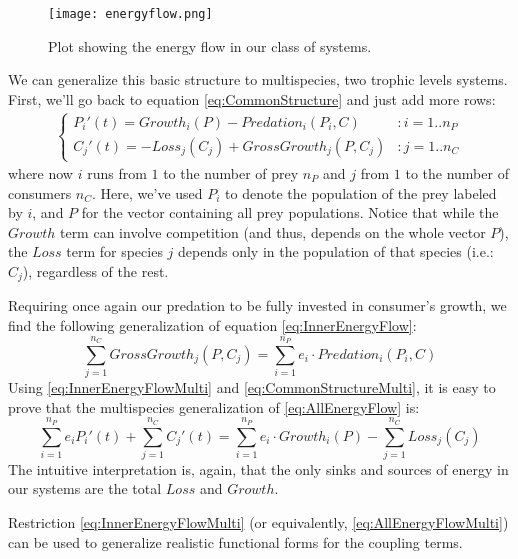 \begin{figure}[H]
	\begin{center}
		\texttt{[image: energyflow.png]}
	\end{center}
	\caption{Plot showing the energy flow in our class of systems.}
	\label{fig:EnergyFlow}
\end{figure}

We can generalize this basic structure to multispecies, two trophic levels systems. First, we'll go back to equation \eqref{eq:CommonStructure} and just add more rows:
%
\begin{eqnarray}
\label{eq:CommonStructureMulti}
	\begin{cases}
	P_i'(t) = Growth_i(P) - Predation_i(P_i,C) & : i = 1..n_P
	\\
	C_j'(t) = -Loss_j(C_j) + GrossGrowth_j(P,C_j) & : j = 1..n_C
	\end{cases}
\end{eqnarray}
%
where now $i$ runs from $1$ to the number of prey $n_P$ and $j$ from $1$ to the number of consumers $n_C$. Here, we've used $P_i$ to denote the population of the prey labeled by $i$, and $P$ for the vector containing all prey populations. Notice that while the $Growth$ term can involve competition (and thus, depends on the whole vector $P$), the $Loss$ term for species $j$ depends only in the population of that species (i.e.: $C_j$), regardless of the rest.

Requiring once again our predation to be fully invested in consumer's growth, we find the following generalization of equation \eqref{eq:InnerEnergyFlow}:
%
\begin{equation}
\label{eq:InnerEnergyFlowMulti}
	\sum_{j = 1}^{n_C} GrossGrowth_j(P,C_j) = \sum_{i = 1}^{n_P} e_i \cdot Predation_i(P_i,C)
\end{equation}
%
Using \eqref{eq:InnerEnergyFlowMulti} and \eqref{eq:CommonStructureMulti}, it is easy to prove that the multispecies generalization of \eqref{eq:AllEnergyFlow} is:
%
\begin{equation}
\label{eq:AllEnergyFlowMulti}
	\sum_{i = 1}^{n_P} e_i P_i'(t) + \sum_{j = 1}^{n_C} C_j'(t) = \sum_{i = 1}^{n_P} e_i \cdot Growth_i(P) - \sum_{j = 1}^{n_C} Loss_j(C_j)
\end{equation}
%
The intuitive interpretation is, again, that the only sinks and sources of energy in our systems are the total $Loss$ and $Growth$.

Restriction \eqref{eq:InnerEnergyFlowMulti} (or equivalently, \eqref{eq:AllEnergyFlowMulti}) can be used to generalize realistic functional forms for the coupling terms.

